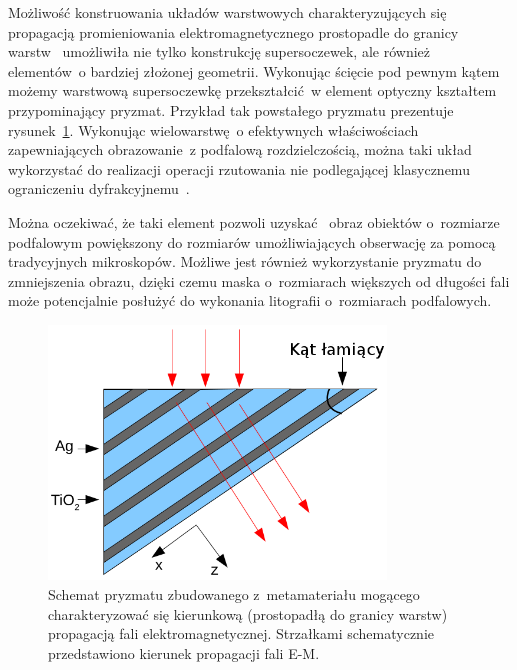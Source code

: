 Możliwość konstruowania układów warstwowych charakteryzujących się propagacją promieniowania elektromagnetycznego prostopadle do granicy warstw~\cite{wood2006directed,quan2006refraction,kotynski2011sub} umożliwiła nie tylko konstrukcję supersoczewek, ale również elementów~o bardziej złożonej geometrii. Wykonując ścięcie pod pewnym kątem możemy warstwową supersoczewkę przekształcić~w element optyczny kształtem przypominający pryzmat. Przykład tak powstałego pryzmatu prezentuje rysunek~\ref{fig:prism-schema}. Wykonując wielowarstwę~o efektywnych właściwościach zapewniających obrazowanie~z podfalową rozdzielczością, można taki układ wykorzystać do realizacji operacji rzutowania nie podlegającej klasycznemu ograniczeniu dyfrakcyjnemu~\cite{prism2010}. 

Można oczekiwać, że taki element pozwoli uzyskać~ obraz obiektów o~rozmiarze podfalowym powiększony do rozmiarów umożliwiających obserwację za pomocą tradycyjnych mikroskopów. Możliwe jest również wykorzystanie pryzmatu do zmniejszenia obrazu, dzięki czemu maska o~rozmiarach większych od długości fali może potencjalnie posłużyć do wykonania litografii o~rozmiarach podfalowych.

			\begin{figure}[tbH]
				\includegraphics[width=0.8\textwidth]{images/multilayer/prism.png}
				\caption{Schemat pryzmatu zbudowanego z~metamateriału mogącego charakteryzować się kierunkową (prostopadłą do granicy warstw) propagacją fali elektromagnetycznej. Strzałkami schematycznie przedstawiono kierunek propagacji fali E-M.}
				\label{fig:prism-schema}
			\end{figure}


